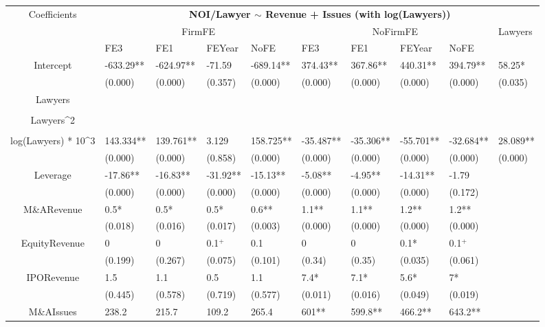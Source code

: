 \documentclass{article}
\begin{document}
\begin{table}[H]
\centering
\begin{tabular}{|clllllllll|}
\hline
\multirow{3}{*}{Coefficients} & \multicolumn{9}{c|}{\textbf{NOI/Lawyer $\sim$ Revenue + Issues (with log(Lawyers))}} \\
\cline{2-10}
& \multicolumn{4}{c}{FirmFE} & \multicolumn{4}{c}{NoFirmFE} & \multirow{2}{*}{Lawyers} \\
\cline{2-9}
& FE3 & FE1 & FEYear & NoFE & FE3 & FE1 & FEYear & NoFE &  \\
\hline
 
Intercept & -633.29** & -624.97** & -71.59 & -689.14** & 374.43** & 367.86** & 440.31** & 394.79** & 58.25* \\ 
   & (0.000) & (0.000) & (0.357) & (0.000) & (0.000) & (0.000) & (0.000) & (0.000) & (0.035) \\ 
  Lawyers &  &  &  &  &  &  &  &  &  \\ 
   &  &  &  &  &  &  &  &  &  \\ 
  Lawyers^2 &  &  &  &  &  &  &  &  &  \\ 
   &  &  &  &  &  &  &  &  &  \\ 
  log(Lawyers) * 10^3 & 143.334** & 139.761** & 3.129 & 158.725** & -35.487** & -35.306** & -55.701** & -32.684** & 28.089** \\ 
   & (0.000) & (0.000) & (0.858) & (0.000) & (0.000) & (0.000) & (0.000) & (0.000) & (0.000) \\ 
  Leverage & -17.86** & -16.83** & -31.92** & -15.13** & -5.08** & -4.95** & -14.31** & -1.79 &  \\ 
   & (0.000) & (0.000) & (0.000) & (0.000) & (0.000) & (0.000) & (0.000) & (0.172) &  \\ 
  M\&ARevenue & 0.5* & 0.5* & 0.5* & 0.6** & 1.1** & 1.1** & 1.2** & 1.2** &  \\ 
   & (0.018) & (0.016) & (0.017) & (0.003) & (0.000) & (0.000) & (0.000) & (0.000) &  \\ 
  EquityRevenue & 0 & 0 & 0.1$^{+}$ & 0.1 & 0 & 0 & 0.1* & 0.1$^{+}$ &  \\ 
   & (0.199) & (0.267) & (0.075) & (0.101) & (0.34) & (0.35) & (0.035) & (0.061) &  \\ 
  IPORevenue & 1.5 & 1.1 & 0.5 & 1.1 & 7.4* & 7.1* & 5.6* & 7* &  \\ 
   & (0.445) & (0.578) & (0.719) & (0.577) & (0.011) & (0.016) & (0.049) & (0.019) &  \\ 
  M\&AIssues & 238.2 & 215.7 & 109.2 & 265.4 & 601** & 599.8** & 466.2** & 643.2** &  \\ 

\end{tabular}
\end{table}
\end{document}
